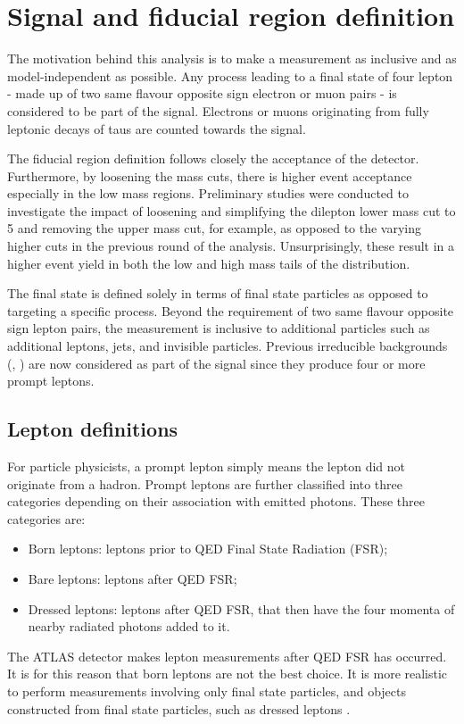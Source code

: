 \section{Signal and fiducial region definition}
\label{sec:signaldef}

The motivation behind this analysis is to make a measurement as inclusive and as model-independent as possible. Any process leading to a final state of four lepton - made up of two same flavour opposite sign electron or muon pairs - is considered to be part of the signal. Electrons or muons originating from fully leptonic decays of taus are counted towards the signal. 

The fiducial region definition follows closely the acceptance of the detector. Furthermore, by loosening the mass cuts, there is higher event acceptance especially in the low mass regions. Preliminary studies were conducted to investigate the impact of loosening and simplifying the dilepton lower mass cut to \unit{5}{\GeV} and removing the upper mass cut, for example, as opposed to the varying higher cuts in the previous round of the analysis. Unsurprisingly, these result in a higher event yield in both the low and high mass tails of the \mFourL distribution. 

The final state is defined solely in terms of final state particles as opposed to targeting a specific process. Beyond the requirement of two same flavour opposite sign lepton pairs, the measurement is inclusive to additional particles such as additional leptons, jets, and invisible particles. Previous irreducible backgrounds (\VVV, \ttZ) are now considered as part of the signal since they produce four or more prompt leptons.


\subsection{Lepton definitions}

For particle physicists, a prompt lepton simply means the lepton did not originate from a hadron. Prompt leptons are further classified into three categories depending on their association with emitted photons. These three categories are:
\begin{itemize}
    \item Born leptons: leptons prior to QED Final State Radiation (FSR);
    \item Bare leptons: leptons after QED FSR;
    \item Dressed leptons: leptons after QED FSR, that then have the four momenta of nearby radiated photons added to it. 
\end{itemize}
The ATLAS detector makes lepton measurements after QED FSR has occurred. It is for this reason that born leptons are not the best choice. It is more realistic to perform measurements involving only final state particles, and objects constructed from final state particles, such as dressed leptons \cite{Kar:ab1be6}. 

